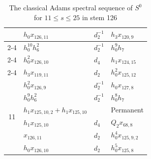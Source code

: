 \begin{table}[htbp]
{\begin{tabular}{|c|l|l|l|}
 & $h_0x_{126,11}$ & $d_{2}^{-1}$ & $h_3x_{120,9}$ \\\cline{2-4}
 & $h_0^{10}h_6^2$ & $d_{2}^{-1}$ & $h_0^9h_7$ \\\cline{2-4}
 & $h_0^2x_{126,10}$ & $d_{4}$ & $h_1x_{124,15}$ \\\cline{2-4}
 & $h_3x_{119,11}$ & $d_{2}$ & $h_0^2x_{125,12}$ \\\hline\hline
\multirow{6}{*}{11} & $h_0^2x_{126,9}$ & $d_{2}^{-1}$ & $h_0x_{127,8}$ \\\cline{2-4}
 & $h_0^9h_6^2$ & $d_{2}^{-1}$ & $h_0^8h_7$ \\\cline{2-4}
 & $h_1x_{125,10,2}+h_1x_{125,10}$ & & Permanent \\\cline{2-4}
 & $h_1x_{125,10}$ & $d_{4}$ & $Q_2x_{68,8}$ \\\cline{2-4}
 & $x_{126,11}$ & $d_{2}$ & $h_0^4x_{125,9,2}$ \\\cline{2-4}
 & $h_0x_{126,10}$ & $d_{2}$ & $h_0^5x_{125,8}$ \\\hline
 \end{tabular}}
\caption{The classical Adams spectral sequence of $S^0$ for $11 \le s \le 25$ in stem 126}
\label{Table:S126.11}
\end{table}


